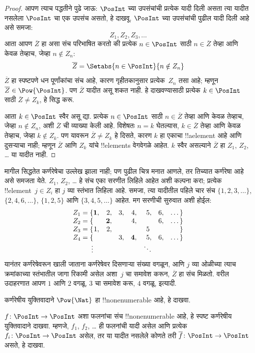\documentclass[../../../include/open-logic-section]{subfiles}
\begin{document}
\begin{proof}
आपण त्याच पद्धतीने पुढे जाऊ: $\PosInt$ च्या उपसंचांची प्रत्येक यादी
दिली असता त्या यादीत नसलेला $\PosInt$ चा एक उपसंच असतो, हे दाखवू.
$\PosInt$ च्या उपसंचांची पुढील यादी दिली आहे असे समजा:
\[
Z_{1}, Z_{2}, Z_{3}, \dots
\]
आता आपण $\overline{Z}$ हा असा संच परिभाषित करतो की प्रत्येक
$n \in \PosInt$ साठी $n \in \overline{Z}$ तेव्हा आणि केवळ तेव्हाच,
जेव्हा $n \notin Z_{n}$:
\[
\overline{Z} = \Setabs{n \in \PosInt}{n \notin Z_n}
\]
$\overline{Z}$ हा स्पष्टपणे धन पूर्णांकांचा संच आहे, कारण गृहीतकानुसार
प्रत्येक~$Z_n$ तसा आहे; म्हणून $\overline{Z} \in
\Pow{\PosInt}$. पण $\overline{Z}$ यादीत असू शकत नाही. हे दाखवण्यासाठी
प्रत्येक $k \in \PosInt$ साठी $\overline{Z} \neq Z_k$, हे सिद्ध करू.

आता $k \in \PosInt$ स्वैर असू द्या. प्रत्येक $n \in \PosInt$ साठी
$n \in \overline{Z}$ तेव्हा आणि केवळ तेव्हाच, जेव्हा $n \notin Z_n$,
अशी $\overline{Z}$ ची व्याख्या केली आहे. विशेषतः $n=k$ घेतल्यास,
$k \in \overline{Z}$ तेव्हा आणि केवळ तेव्हाच, जेव्हा $k \notin Z_k$.
पण यावरून $\overline{Z} \neq Z_k$ हे दिसते, कारण $k$ हा एकाचा
!!a{element} आहे आणि दुसऱ्याचा नाही; म्हणून $\overline{Z}$ आणि $Z_k$
यांचे !!{element}s वेगवेगळे आहेत. $k$ स्वैर असल्याने $\overline{Z}$ हा
$Z_1$, $Z_2$, \dots{} या यादीत नाही.
\end{proof}

\begin{explain}
मागील सिद्धतेत कर्णरेषेचा उल्लेख झाला नाही; पण पुढील चित्र मनात आणले,
तर तिच्यात कर्णरेषा आहे असे समजता येते. $Z_1$, $Z_2$, \dots{} हे संच
एका सरणीत लिहिले आहेत अशी कल्पना करा; प्रत्येक !!{element}~$j \in Z_i$
हा $j$ व्या स्तंभात लिहिला आहे. समजा, त्या यादीतील पहिले चार संच
$\{1,2,3,\dots\}$, $\{2, 4, 6, \dots\}$, $\{1,2,5\}$ आणि
$\{3,4,5,\dots\}$ आहेत. मग सरणीची सुरुवात अशी होईल:
\[
\begin{array}{r@{}rrrrrrr}
  Z_1 = \{ & \mathbf{1}, & 2, & 3, & 4, & 5, & 6, & \dots\}\\
  Z_2 = \{ &  & \mathbf{2}, &  & 4, &  & 6, & \dots\}\\
  Z_3 = \{ & 1, & 2, &  &  & 5\phantom{,} &  & \}\\
  Z_4 = \{ &  &  & 3, & \mathbf{4}, & 5, & 6, & \dots\}\\
  \vdots & & & & & \ddots
\end{array}
\]
यानंतर कर्णरेषेवरून खाली जाताना कर्णरेषेवर दिसणाऱ्या संख्या वगळून,
आणि $j$ व्या ओळीच्या त्याच क्रमांकाच्या स्तंभातील जागा रिकामी असेल अशा~$j$
चा समावेश करून, $\overline{Z}$ हा संच मिळतो. वरील उदाहरणात
आपण $1$ आणि $2$ वगळू, $3$ चा समावेश करू, $4$ वगळू, इत्यादी.
\end{explain}

\begin{prob}
कर्णरेषीय युक्तिवादाने $\Pow{\Nat}$ हा !!{nonenumerable} आहे, हे दाखवा.
\end{prob}

\begin{prob}\label{sfr:siz:nen:prob:f-posint}
$f \colon \PosInt \to \PosInt$ अशा फलनांचा संच !!{nonenumerable}
आहे, हे स्पष्ट कर्णरेषीय युक्तिवादाने दाखवा. म्हणजे, $f_1$, $f_2$,
\dots{} ही फलनांची यादी असेल आणि प्रत्येक $f_i\colon
\PosInt \to \PosInt$ असेल, तर या यादीत नसलेले कोणते तरी
$\overline{f}\colon \PosInt \to \PosInt$ असते, हे दाखवा.
\end{prob}
\end{document}
